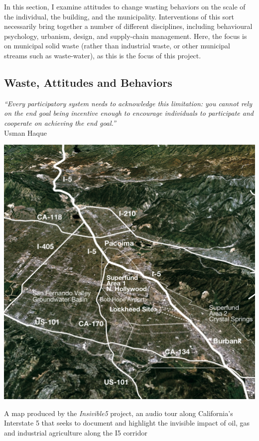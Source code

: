 \documentclass[nofonts,nols,justified,nobib]{tufte-book}
\begin{document}
In this section, I examine attitudes to change wasting behaviors on the scale of the individual, the building, and the municipality. Interventions of this sort necessarily bring together a number of different disciplines, including behavioural psychology, urbanism, design, and supply-chain management. Here, the focus is on municipal solid waste (rather than industrial waste, or other municipal streams such as waste-water), as this is the focus of this project.

\subsection*{Waste, Attitudes and Behaviors}

\begin{flushright}
\emph{``Every participatory system needs to acknowledge this limitation: you cannot
 rely on the end goal being incentive enough to encourage individuals to 
participate and cooperate on achieving the end goal.''} \cite{haque_notes_2008}\\
Usman Haque
\end{flushright}

\begin{marginfigure}
\includegraphics[width=\textwidth]{img/1/invisible5.png}
\caption{A map produced by the \emph{Insivible5} project, an audio tour along California's Interstate 5 that seeks to document and highlight the invisible impact of oil, gas and industrial agriculture along the I5 corridor \cite{balkin_invisible5_2006} }
\end{marginfigure}
\end{document}
